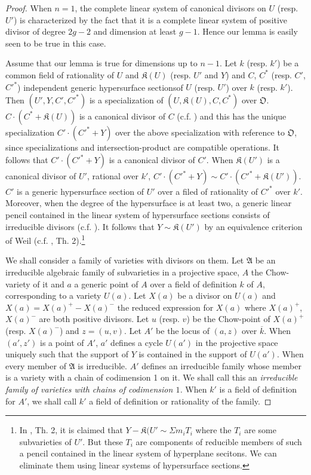 \begin{proof}
When $n=1$, the complete linear system of canonical divisors on $U$ (resp. $U'$) is characterized by the fact that it is a complete linear system of positive divisor of degree $2g-2$ and dimension at least $g-1$. Hence our lemma is easily seen to be true in this case.

Assume that our lemma is true for dimensions up to $n-1$. Let $k$ (resp. $k'$) be a common field of rationality of $U$ and $\mathfrak{K}(U)$ (resp. $U'$ and $Y$) and $C$, $C^{*}$ (resp. $C'$, ${C'}^{*}$) independent generic hypersurface sections\pageoriginale of $U$ (resp. $U'$) over $k$ (resp. $k'$). Then $(U',Y,C',{C'}^{*})$ is a specialization of $(U,\mathfrak{K}(U), C,C^{*})$ over $\mathfrak{O}$. $C\cdot (C^{*}+\mathfrak{K}(U))$ is a canonical divisor of $C$ (c.f. \cite{art14-key31}) and this has the unique specialization $C'\cdot ({C'}^{*}+Y)$ over the above specialization with reference to $\mathfrak{O}$, since specializations and intersection-product are compatible operations. It follows that $C'\cdot ({C'}^{*}+Y)$ is a canonical divisor of $C'$. When $\mathfrak{K}(U')$ is a canonical divisor of $U'$, rational over $k'$, $C'\cdot ({C'}^{*}+Y)\sim C'\cdot ({C'}^{*}+\mathfrak{K}(U'))$. $C'$ is a generic hypersurface section of $U'$ over a filed of rationality of ${C'}^{*}$ over $k'$. Moreover, when the degree of the hypersurface is at least two, a generic linear pencil contained in the linear system of hypersurface sections consists of irreducible divisors (c.f. \cite{art14-key19}). It follows that $Y\sim \mathfrak{K}(U')$ by an equivalence criterion of Weil (c.f. \cite{art14-key27}, Th. 2).\footnote{In \cite{art14-key27}, Th. 2, it is claimed that $Y-\mathfrak{K}(U'\sim \Sigma m_{i}T_{i}$ where the $T_{i}$ are some subvarieties of $U'$. But these $T_{i}$ are components of reducible members of such a pencil contained in the linear system of hyperplane secitons. We can eliminate them using linear systems of hypersurface sections.}

We shall consider a family of varieties with divisors on them. Let $\mathfrak{A}$ be an irreducible algebraic family of subvarieties in a projective space, $A$ the Chow-variety of it and $a$ a generic point of $A$ over a field of definition $k$ of $A$, corresponding to a variety $U(a)$. Let $X(a)$ be a divisor on $U(a)$ and $X(a)=X(a)^{+}-X(a)^{-}$ the reduced expression for $X(a)$ where $X(a)^{+}$, $X(a)^{-}$ are both positive divisors. Let $u$ (resp. $v$) be the Chow-point of $X(a)^{+}$ (resp. $X(a)^{-}$) and $z=(u,v)$. Let $A'$ be the locus of $(a,z)$ over $\overline{k}$. When $(a',z')$ is a point of $A'$, $a'$ defines a cycle $U(a')$ in the projective space uniquely such that the support of $Y$ is contained in the support of $U(a')$. When every member of $\mathfrak{A}$ is irreducible. $A'$ defines an irreducible family whose member is a variety with a chain of codimension 1 on it. We shall call this an {\em irreducible family of varieties with chains of codimension $1$.} When $k'$ is a field of definition for $A'$, we shall call $k'$ a field of definition or rationality of the family.
\end{proof}

